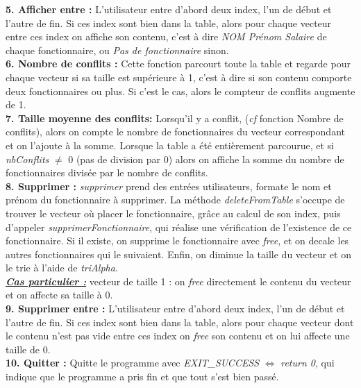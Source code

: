 \noindent
\textbf{5. Afficher entre :} L'utilisateur entre d'abord deux index, l'un de début et l'autre de fin. Si ces index sont bien dans la table, alors pour chaque vecteur entre ces index on affiche son contenu, c'est à dire \textit{NOM Prénom Salaire} de chaque fonctionnaire, ou \textit{Pas de fonctionnaire} sinon.\\

\noindent
\textbf{6. Nombre de conflits :} Cette fonction parcourt toute la table et regarde pour chaque vecteur si sa taille est supérieure à 1, c'est à dire si son contenu comporte deux fonctionnaires ou plus. Si c'est le cas, alors le compteur de conflits augmente de 1.\\

\noindent
\textbf{7. Taille moyenne des conflits:} Lorsqu'il y a conflit, (\textit{cf} fonction Nombre de conflits), alors on compte le nombre de fonctionnaires du vecteur correspondant et on l'ajoute à la somme. Lorsque la table a été entièrement parcourue, et si \textit{nbConflits} $\neq$ 0 (pas de division par 0) alors on affiche la somme du nombre de fonctionnaires divisée par le nombre de conflits.\\

\noindent
\textbf{8. Supprimer :} \textit{supprimer} prend des entrées utilisateurs, formate le nom et prénom du fonctionnaire à supprimer. La méthode \textit{deleteFromTable} s'occupe de trouver le vecteur où placer le fonctionnaire, grâce au calcul de son index, puis d'appeler \textit{supprimerFonctionnaire}, qui réalise une vérification de l'existence de ce fonctionnaire. Si il existe, on supprime le fonctionnaire avec \textit{free}, et on decale les autres fonctionnaires qui le suivaient. Enfin, on diminue la taille du vecteur et on le trie à l'aide de \textit{triAlpha}.\\\textbf{\textit{\underline{Cas particulier :}}} vecteur de taille 1 : on \textit{free} directement le contenu du vecteur et on affecte sa taille à 0.\\

\noindent
\textbf{9. Supprimer entre :} L'utilisateur entre d'abord deux index, l'un de début et l'autre de fin. Si ces index sont bien dans la table, alors pour chaque vecteur dont le contenu n'est  pas vide entre ces index on \textit{free} son contenu et on lui affecte une taille de 0.\\

\noindent
\textbf{10. Quitter :} Quitte le programme avec \textit{EXIT\_SUCCESS} $\Leftrightarrow$ \textit{return 0}, qui indique que le programme a pris fin et que tout s'est bien passé.\\